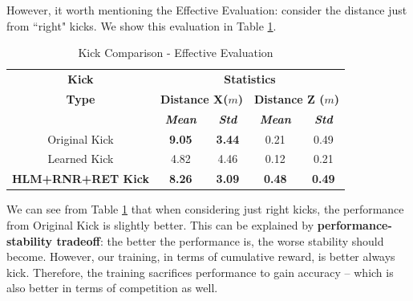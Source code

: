 However, it worth mentioning the Effective Evaluation: consider the distance just from ``right" kicks. We show this evaluation in Table \ref{tab:finaltesteff}.

\begin{table}[!htbp]
	\caption{Kick Comparison - Effective Evaluation}
	\begin{center} 
		\begin{tabular}{|c|c|c|c|c|}
			\hline
			\textbf{Kick}&\multicolumn{4}{|c|}{\textbf{Statistics}} \\
			\cline{2-5} 
			\textbf{Type} &  \multicolumn{2}{|c|}{\textbf{Distance X(\(m\))}}& 
			\multicolumn{2}{|c|}{\textbf{Distance Z (\(m\))}}\\
			\cline {2-5} 
			& \textbf{\textit{Mean}}& \textbf{\textit{Std}}
			& \textbf{\textit{Mean}}& \textbf{\textit{Std}} \\
			\hline
			Original Kick  & \textbf{9.05} & \textbf{3.44} & 0.21 & 0.49 \\
			\hline
			Learned Kick  & 4.82 & 4.46 & 0.12 & 0.21 \\
			\hline
			\textbf{HLM+RNR+RET Kick} & \textbf{8.26} & \textbf{3.09} & \textbf{0.48} & \textbf{0.49}  \\
			\hline
		\end{tabular}
		\label{tab:finaltesteff}
	\end{center}
\end{table}

We can see from Table \ref{tab:finaltesteff} that when considering just right kicks, the performance from Original Kick is slightly better. This can be explained by \textbf{performance-stability tradeoff}: the better the performance is, the worse stability should become. However, our training, in terms of cumulative reward, is better always kick. Therefore, the training sacrifices performance to gain accuracy -- which is also better in terms of competition as well.